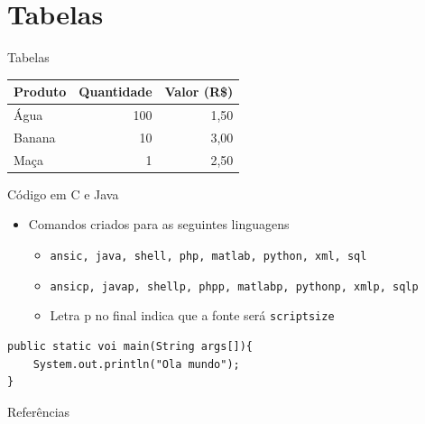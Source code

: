 \documentclass{beamer}
\begin{document}
\section{Tabelas}

\begin{frame}{Tabelas}
\begin{center}
    \begin{tabular}{l r r}\\\toprule
        Produto & Quantidade & Valor (R\$) \\\midrule
        Água    &      100   &   1,50 \\ 
        Banana  &       10   &   3,00 \\
        Maça    &        1   &   2,50 \\ \bottomrule
    \end{tabular}
\end{center}
\end{frame}






\begin{frame}[fragile]{Código em C e Java}

\begin{itemize}
		\item Comandos criados para as seguintes linguagens
		\begin{itemize}
			\item \texttt{ansic, java, shell, php, matlab, python, xml, sql}
			\item \texttt{ansicp, javap, shellp, phpp, matlabp, pythonp, xmlp, sqlp}
			\item Letra p no final indica que a fonte será \texttt{scriptsize}
		\end{itemize}
\end{itemize}



\javap
\begin{lstlisting}
public static voi main(String args[]){
	System.out.println("Ola mundo");
}
\end{lstlisting}		
\end{frame}
    

\begin{frame}{Referências}
    \nocite{*}
    
    
\end{frame}
\end{document}
